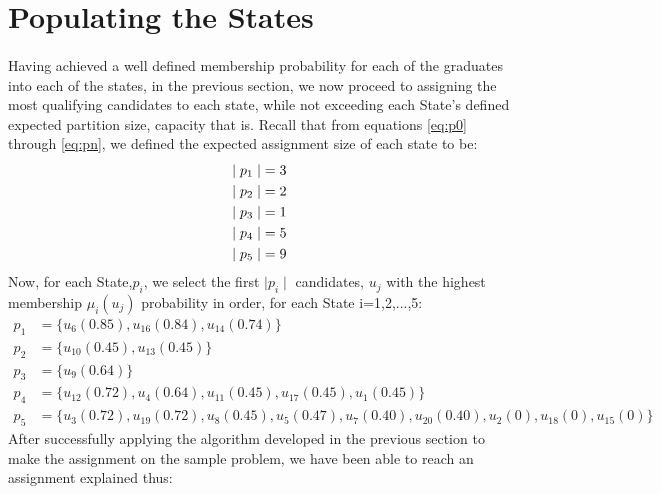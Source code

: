 \documentclass[a4paper,openany]{book}
\begin{document}
		\section{Populating the States}
			\paragraph{}
				Having achieved a well defined membership probability for each of the graduates into each of the states, in the previous section, we now proceed to assigning the most qualifying candidates to each state, while not exceeding each State's defined expected partition size, capacity that is.
				Recall that from equations \ref{eq:p0} through \ref{eq:pn}, we defined the expected assignment size of each state to be:
				\begin{align}
					\mid p_1 \mid &= 3 \notag \\
					\mid p_2 \mid &= 2 \notag \\
					\mid p_3 \mid &= 1 \notag \\
					\mid p_4 \mid &= 5 \notag \\
					\mid p_5 \mid &= 9 \notag
				\end{align}
				Now, for each State,$p_i$, we select the first $\mid p_i \mid$ candidates, $u_j$ with the highest membership $\mu_i(u_j)$ probability in order, for each State i=1,2,...,5:
				\begin{align}
					p_1 &= \{u_6(0.85), u_{16}(0.84), u_{14}(0.74)\}\\
					p_2 &= \{u_{10}(0.45), u_{13}(0.45)\}\\
					p_3 &= \{u_{9}(0.64)\}\\
					p_4 &= \{u_{12}(0.72),u_{4}(0.64),u_{11}(0.45),u_{17}(0.45),u_{1}(0.45)\}\\
					p_5 &= \{u_{3}(0.72),u_{19}(0.72),u_{8}(0.45),u_{5}(0.47),u_{7}(0.40),u_{20}(0.40),u_{2}(0),u_{18}(0),u_{15}(0)\}
				\end{align}
				After successfully applying the algorithm developed in the previous section to make the assignment on the sample problem, we have been able to reach an assignment explained thus:
\end{document}
